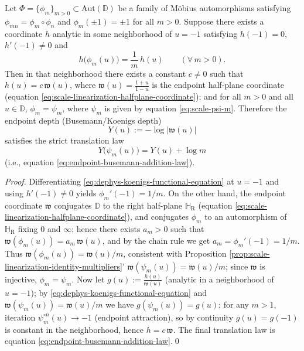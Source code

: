 \begin{theorem}\label{thm:dephys-endpoint-koenigs-rigidity}
Let \(\Phi=\{\phi_m\}_{m>0}\subset \mathrm{Aut}(\mathbb{D})\) be a family of Möbius automorphisms satisfying \(\phi_{mn}=\phi_m\circ\phi_n\) and \(\phi_m(\pm 1)=\pm 1\) for all \(m>0\).
Suppose there exists a coordinate \(h\) analytic in some neighborhood of \(u=-1\) satisfying \(h(-1)=0\), \(h'(-1)\neq 0\) and
\begin{equation}\label{eq:dephys-koenigs-functional-equation}
h\bigl(\phi_m(u)\bigr)=\frac{1}{m}\,h(u)\qquad(\forall\,m>0).
\end{equation}
Then in that neighborhood there exists a constant \(c\neq 0\) such that \(h(u)=c\,\mathfrak{w}(u)\), where \(\mathfrak{w}(u)=\frac{1+u}{1-u}\) is the endpoint half-plane coordinate (equation \eqref{eq:scale-linearization-halfplane-coordinate}); and for all \(m>0\) and all \(u\in\mathbb{D}\), \(\phi_m=\psi_m\), where \(\psi_m\) is given by equation \eqref{eq:scale-psi-m}.
Therefore the endpoint depth (Busemann/Koenigs depth)
\[
Y(u):=-\log\bigl|\mathfrak{w}(u)\bigr|
\]
satisfies the strict translation law
\[
Y\!\bigl(\psi_m(u)\bigr)=Y(u)+\log m
\]
(i.e., equation \eqref{eq:endpoint-busemann-addition-law}).
\end{theorem}

\begin{proof}
Differentiating \eqref{eq:dephys-koenigs-functional-equation} at \(u=-1\) and using \(h'(-1)\neq 0\) yields \(\phi_m'(-1)=1/m\).
On the other hand, the endpoint coordinate \(\mathfrak{w}\) conjugates \(\mathbb{D}\) to the right half-plane \(\mathbb{H}_{\mathrm{R}}\) (equation \eqref{eq:scale-linearization-halfplane-coordinate}), and conjugates \(\phi_m\) to an automorphism of \(\mathbb{H}_{\mathrm{R}}\) fixing \(0\) and \(\infty\); hence there exists \(a_m>0\) such that
\(
\mathfrak{w}(\phi_m(u))=a_m\,\mathfrak{w}(u)
\), and by the chain rule we get \(a_m=\phi_m'(-1)=1/m\).
Thus \(\mathfrak{w}(\phi_m(u))=\mathfrak{w}(u)/m\), consistent with Proposition \ref{prop:scale-linearization-identity-multipliers}' \(\mathfrak{w}(\psi_m(u))=\mathfrak{w}(u)/m\); since \(\mathfrak{w}\) is injective, \(\phi_m=\psi_m\).
Now let \(g(u):=\frac{h(u)}{\mathfrak{w}(u)}\) (analytic in a neighborhood of \(u=-1\)); by \eqref{eq:dephys-koenigs-functional-equation} and \(\mathfrak{w}(\psi_m(u))=\mathfrak{w}(u)/m\) we have \(g(\psi_m(u))=g(u)\);
for any \(m>1\), iteration \(\psi_m^{\circ n}(u)\to-1\) (endpoint attraction), so by continuity \(g(u)=g(-1)\) is constant in the neighborhood, hence \(h=c\,\mathfrak{w}\).
The final translation law is equation \eqref{eq:endpoint-busemann-addition-law}.\qed
\end{proof}

